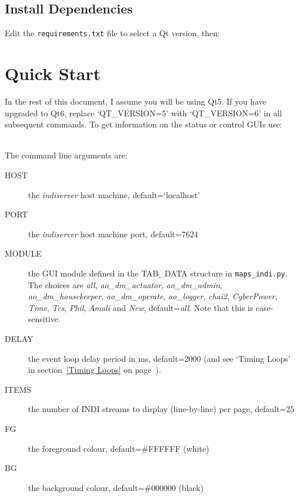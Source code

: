 \documentclass[12pt,twoside]{article}
\begin{document}
\noindent  {}

\noindent  {}

\noindent  {}


\subsection{Install Dependencies}
\label{Install Dependencies}

Edit the {\tt requirements.txt} file to select a Qt version, then: \\

\noindent  {}

\section{Quick Start}
\label{Quick Start}

In the rest of this document, I assume you will be using Qt5. If you have upgraded to Qt6, replace `QT\_VERSION=5' with `QT\_VERSION=6'
in all subsequent commands. To get information on the status or control GUIs use: \\

\noindent {} 

\noindent  {}  \\

The command line arguments are: \\

\begin{description}
 \item[HOST] the \emph{indiserver} host machine, default=`localhost'
 \item[PORT] the \emph{indiserver} host machine port, default=7624
 \item[MODULE] the GUI module defined in the TAB\_DATA structure in {\tt maps\_indi.py}. The choices are
               \emph{all}, \emph{ao\_dm\_actuator}, \emph{ao\_dm\_admin}, \emph{ao\_dm\_housekeeper}, \emph{ao\_dm\_operate}, 
               \emph{ao\_logger}, \emph{chai2}, \emph{CyberPower}, \emph{Time}, \emph{Tcs}, \emph{Phil}, \emph{Amali} and \emph{New}, default=\emph{all}.
               Note that this is case-sensitive.
 \item[DELAY] the event loop delay period in ms, default=2000 (and see `Timing Loops' in section~\ref{Timing Loops} on page~\pageref{Timing Loops}).
 \item[ITEMS] the number of INDI streams to display (line-by-line) per page, default=25
 \item[FG] the foreground colour, default=\#FFFFFF (white)
 \item[BG] the background colour, default=\#000000 (black)
\end{description}
\end{document}
